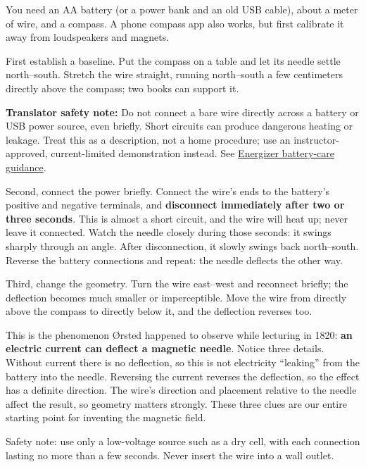 \begin{experiment}
You need an AA battery (or a power bank and an old USB cable), about a meter of wire, and a compass. A phone compass app also works, but first calibrate it away from loudspeakers and magnets.

First establish a baseline. Put the compass on a table and let its needle settle north--south. Stretch the wire straight, running north--south a few centimeters directly above the compass; two books can support it.

\textbf{Translator safety note:} Do not connect a bare wire directly across a battery or USB power source, even briefly. Short circuits can produce dangerous heating or leakage. Treat this as a description, not a home procedure; use an instructor-approved, current-limited demonstration instead. See \href{https://oem.energizer.com/english/dos-donts/}{Energizer battery-care guidance}.

Second, connect the power briefly. Connect the wire's ends to the battery's positive and negative terminals, and \textbf{disconnect immediately after two or three seconds}. This is almost a short circuit, and the wire will heat up; never leave it connected. Watch the needle closely during those seconds: it swings sharply through an angle. After disconnection, it slowly swings back north--south. Reverse the battery connections and repeat: the needle deflects the other way.

Third, change the geometry. Turn the wire east--west and reconnect briefly; the deflection becomes much smaller or imperceptible. Move the wire from directly above the compass to directly below it, and the deflection reverses too.

This is the phenomenon Ørsted happened to observe while lecturing in 1820: \textbf{an electric current can deflect a magnetic needle}. Notice three details. Without current there is no deflection, so this is not electricity ``leaking'' from the battery into the needle. Reversing the current reverses the deflection, so the effect has a definite direction. The wire's direction and placement relative to the needle affect the result, so geometry matters strongly. These three clues are our entire starting point for inventing the magnetic field.

Safety note: use only a low-voltage source such as a dry cell, with each connection lasting no more than a few seconds. Never insert the wire into a wall outlet.
\end{experiment}

